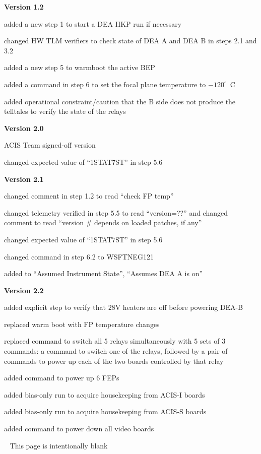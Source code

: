 \documentclass[11pt]{article}
\begin{document}
\newpage


\bd
\item {\bf Version 1.2}
\bi
\item added a new step 1 to start a DEA HKP run if necessary
\item changed HW TLM verifiers to check state of DEA A and DEA B in
steps 2.1 and 3.2
\item added a new step 5 to warmboot the active BEP
\item added a command in step 6 to set the focal plane temperature to
$-120^\circ$~C
\item added operational constraint/caution that the B side does not
produce the telltales to verify the state of the relays
\ei

\item {\bf Version 2.0}
\bi
\item ACIS Team signed-off version
\item changed expected value of ``1STAT7ST'' in step 5.6
\ei

\item {\bf Version 2.1}
\bi
\item changed comment in step 1.2 to read ``check FP temp''
\item changed telemetry verified in step 5.5 to read ``version=??''
  and changed comment to read ``version \# depends on loaded patches,
  if any''
\item changed expected value of ``1STAT7ST'' in step 5.6
\item changed command in step 6.2 to WSFTNEG121
\item added to ``Assumed Instrument State'', ``Assumes DEA A is on''
\ei

{\color{red}
\item {\bf Version 2.2}
\bi
\item added explicit step to verify that 28V heaters are off before powering DEA-B
\item replaced warm boot with FP temperature changes
\item replaced command to switch all 5 relays simultaneously with 5 sets of 3 commands:
a command to switch one of the relays,
followed by a pair of commands to power up each of the two boards controlled by that relay
\item added command to power up 6 FEPs
\item added bias-only run to acquire housekeeping from ACIS-I boards
\item added bias-only run to acquire housekeeping from ACIS-S boards
\item added command to power down all video boards
\ei}
\ed

\newpage\
\vspace{0.4\textheight}
\bc This page is intentionally blank \ec

\newcommand{\tablecaptiontext}{SWITCH FROM DEA A TO DEA B}

\end{document}
